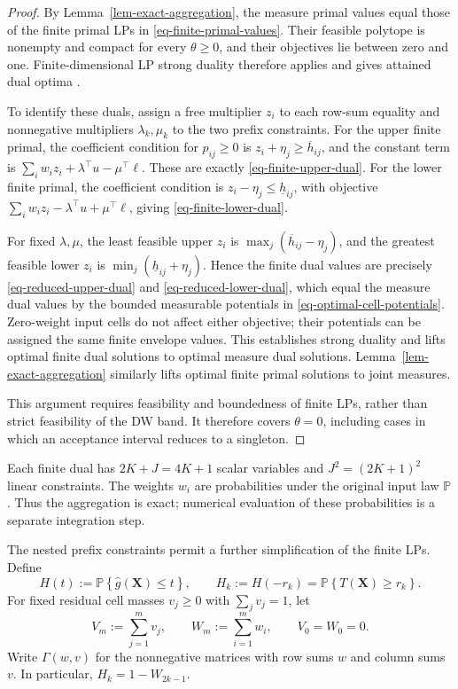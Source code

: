 \documentclass[review,11pt,3p,authoryear,nopreprintline]{elsarticle}
\begin{document}
\begin{proof}
  By Lemma~\ref{lem-exact-aggregation}, the measure primal values equal those of the finite primal LPs in \eqref{eq-finite-primal-values}. Their feasible polytope is nonempty and compact for every $\theta\ge0$, and their objectives lie between zero and one. Finite-dimensional LP strong duality therefore applies and gives attained dual optima \citep[Section~5.2.3]{B.V04}.

  To identify these duals, assign a free multiplier $z_i$ to each row-sum equality and nonnegative multipliers $\lambda_k,\mu_k$ to the two prefix constraints. For the upper finite primal, the coefficient condition for $p_{ij}\ge0$ is
  $z_i+\eta_j\ge\overline h_{ij}$, and the constant term is
  $\sum_iw_i z_i+\lambda^\top u-\mu^\top\ell$.
  These are exactly \eqref{eq-finite-upper-dual}. For the lower finite primal, the coefficient condition is
  $z_i-\eta_j\le\underline h_{ij}$, with objective
  $\sum_iw_i z_i-\lambda^\top u+\mu^\top\ell$,
  giving \eqref{eq-finite-lower-dual}.

  For fixed $\lambda,\mu$, the least feasible upper $z_i$ is
  $\max_j(\overline h_{ij}-\eta_j)$, and the greatest feasible lower $z_i$ is
  $\min_j(\underline h_{ij}+\eta_j)$.
  Hence the finite dual values are precisely \eqref{eq-reduced-upper-dual} and \eqref{eq-reduced-lower-dual}, which equal the measure dual values by the bounded measurable potentials in \eqref{eq-optimal-cell-potentials}. Zero-weight input cells do not affect either objective; their potentials can be assigned the same finite envelope values. This establishes strong duality and lifts optimal finite dual solutions to optimal measure dual solutions. Lemma~\ref{lem-exact-aggregation} similarly lifts optimal finite primal solutions to joint measures.

  This argument requires feasibility and boundedness of finite LPs, rather than strict feasibility of the DW band. It therefore covers $\theta=0$, including cases in which an acceptance interval reduces to a singleton.
\end{proof}

Each finite dual has $2K+J=4K+1$ scalar variables and $J^2=(2K+1)^2$ linear constraints. The weights $w_i$ are probabilities under the original input law $\mathbb P$. Thus the aggregation is exact; numerical evaluation of these probabilities is a separate integration step.

The nested prefix constraints permit a further simplification of the finite LPs. Define
\begin{equation}
  H(t):=\mathbb P\left\{\hat g(\bm X)\le t\right\},
  \qquad H_k:=H(-r_k)=\mathbb P\left\{T(\bm X)\ge r_k\right\}.
  \label{eq-surrogate-response-cdf}
\end{equation}
For fixed residual cell masses $v_j\ge0$ with $\sum_jv_j=1$, let
\[
  V_m:=\sum_{j=1}^m v_j,\qquad
  W_m:=\sum_{i=1}^m w_i,\qquad
  V_0=W_0=0.
\]
Write $\Gamma(w,v)$ for the nonnegative matrices with row sums $w$ and column sums $v$. In particular, $H_k=1-W_{2k-1}$.
\end{document}
